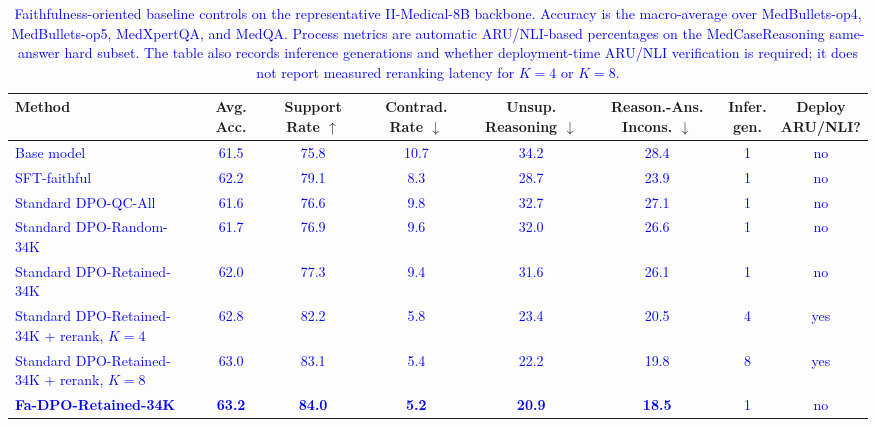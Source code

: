 \documentclass[12pt]{article}
\newcommand{\added}[1]{\textcolor{blue}{#1}}
\begin{document}
\begin{table}[htbp]
\centering
\scriptsize
\setlength{\tabcolsep}{3.0pt}
\caption{\added{Faithfulness-oriented baseline controls on the representative II-Medical-8B backbone. Accuracy is the macro-average over MedBullets-op4, MedBullets-op5, MedXpertQA, and MedQA. Process metrics are automatic ARU/NLI-based percentages on the MedCaseReasoning same-answer hard subset. The table also records inference generations and whether deployment-time ARU/NLI verification is required; it does not report measured reranking latency for $K=4$ or $K=8$.}}
\label{tab:response_r24_faithfulness_baseline_results}
\begin{adjustbox}{max width=\textwidth}
\begin{tabular}{lccccccc}
\toprule
\textbf{Method} & \textbf{Avg. Acc.} & \shortstack[c]{\textbf{Support}\\\textbf{Rate $\uparrow$}} & \shortstack[c]{\textbf{Contrad.}\\\textbf{Rate $\downarrow$}} & \shortstack[c]{\textbf{Unsup.}\\\textbf{Reasoning $\downarrow$}} & \shortstack[c]{\textbf{Reason.-Ans.}\\\textbf{Incons. $\downarrow$}} & \shortstack[c]{\textbf{Infer.}\\\textbf{gen.}} & \shortstack[c]{\textbf{Deploy}\\\textbf{ARU/NLI?}} \\
\midrule
\added{Base model} & \added{61.5} & \added{75.8} & \added{10.7} & \added{34.2} & \added{28.4} & \added{1} & \added{no} \\
\added{SFT-faithful} & \added{62.2} & \added{79.1} & \added{8.3} & \added{28.7} & \added{23.9} & \added{1} & \added{no} \\
\added{Standard DPO-QC-All} & \added{61.6} & \added{76.6} & \added{9.8} & \added{32.7} & \added{27.1} & \added{1} & \added{no} \\
\added{Standard DPO-Random-34K} & \added{61.7} & \added{76.9} & \added{9.6} & \added{32.0} & \added{26.6} & \added{1} & \added{no} \\
\added{Standard DPO-Retained-34K} & \added{62.0} & \added{77.3} & \added{9.4} & \added{31.6} & \added{26.1} & \added{1} & \added{no} \\
\added{Standard DPO-Retained-34K + rerank, $K=4$} & \added{62.8} & \added{82.2} & \added{5.8} & \added{23.4} & \added{20.5} & \added{4} & \added{yes} \\
\added{Standard DPO-Retained-34K + rerank, $K=8$} & \added{63.0} & \added{83.1} & \added{5.4} & \added{22.2} & \added{19.8} & \added{8} & \added{yes} \\
\added{\textbf{Fa-DPO-Retained-34K}} & \added{\textbf{63.2}} & \added{\textbf{84.0}} & \added{\textbf{5.2}} & \added{\textbf{20.9}} & \added{\textbf{18.5}} & \added{1} & \added{no} \\
\bottomrule
\end{tabular}
\end{adjustbox}
\end{table}
\end{document}
